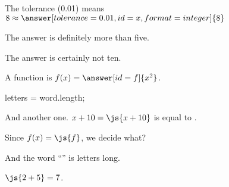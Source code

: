 \documentclass{ximera}
\begin{document}
\begin{problem}
  The tolerance (0.01) means $8 \approx \answer[tolerance=0.01,id=x,format=integer]{8}$
  
  \begin{feedback}
    The answer is definitely more than five.
  \end{feedback}

  \begin{feedback}[x==10]
    The answer is certainly not ten.
  \end{feedback}

  A function is $f(x) = \answer[id=f]{x^2}$.
\end{problem}

\begin{javascript}
  letters = word.length;
\end{javascript}

And another one.  $x + 10 = \js{x+10}$ is equal to .

Since $f(x) = \js{f}$, we decide what?

And the word ``'' is  letters long.

$\js{2+5} = 7$.
\end{document}
